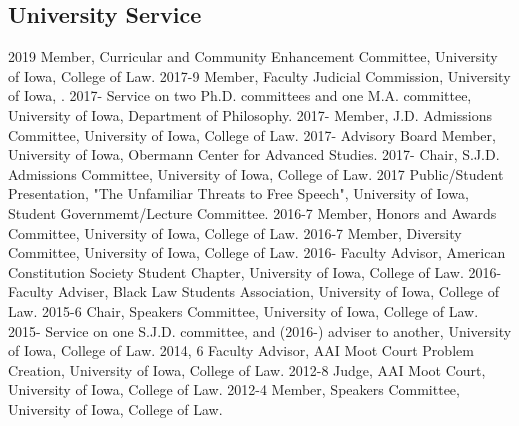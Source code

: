 \documentclass[letterpaper]{moderncv}
\begin{document}
\subsection{University Service}
\cvitem
{2019}
{Member, Curricular and Community Enhancement Committee, University of Iowa, College of Law.}
\vspace{1mm}
\cvitem
{2017-9}
{Member, Faculty Judicial Commission, University of Iowa, .}
\vspace{1mm}
\cvitem
{2017-}
{Service on two Ph.D. committees and one M.A. committee, University of Iowa, Department of Philosophy.}
\vspace{1mm}
\cvitem
{2017-}
{Member, J.D. Admissions Committee, University of Iowa, College of Law.}
\vspace{1mm}
\cvitem
{2017-}
{Advisory Board Member, University of Iowa, Obermann Center for Advanced Studies.}
\vspace{1mm}
\cvitem
{2017-}
{Chair, S.J.D. Admissions Committee, University of Iowa, College of Law.}
\vspace{1mm}
\cvitem
{2017}
{Public/Student Presentation, "The Unfamiliar Threats to Free Speech", University of Iowa, Student Governmemt/Lecture Committee.}
\vspace{1mm}
\cvitem
{2016-7}
{Member, Honors and Awards Committee, University of Iowa, College of Law.}
\vspace{1mm}
\cvitem
{2016-7}
{Member, Diversity Committee, University of Iowa, College of Law.}
\vspace{1mm}
\cvitem
{2016-}
{Faculty Advisor, American Constitution Society Student Chapter, University of Iowa, College of Law.}
\vspace{1mm}
\cvitem
{2016-}
{Faculty Adviser, Black Law Students Association, University of Iowa, College of Law.}
\vspace{1mm}
\cvitem
{2015-6}
{Chair, Speakers Committee, University of Iowa, College of Law.}
\vspace{1mm}
\cvitem
{2015-}
{Service on one S.J.D. committee, and (2016-) adviser to another, University of Iowa, College of Law.}
\vspace{1mm}
\cvitem
{2014, 6}
{Faculty Advisor, AAI Moot Court Problem Creation, University of Iowa, College of Law.}
\vspace{1mm}
\cvitem
{2012-8}
{Judge, AAI Moot Court, University of Iowa, College of Law.}
\vspace{1mm}
\cvitem
{2012-4}
{Member, Speakers Committee, University of Iowa, College of Law.}
\vspace{1mm}
\end{document}
